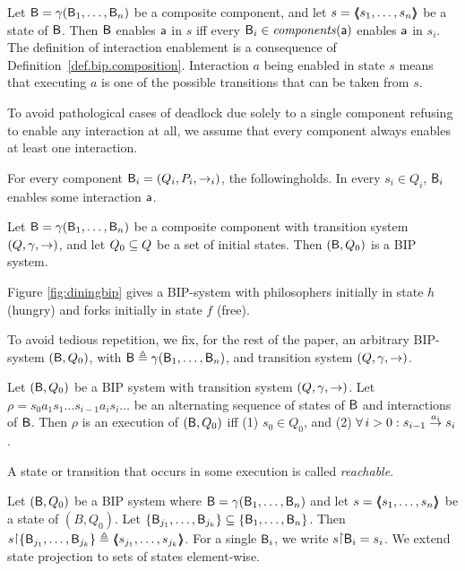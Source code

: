 Let $\B = \gamma(\B_1,\dots,\B_n)$ be a composite component, and let $s =
\tpl{s_1,\ldots,s_n}$ be a state of $\B$.  Then $\B$ enables $\act$ in $s$
iff every $\B_i \in \cmps{\act}$ enables $\act$ in $s_i$.  
\ed
%
The definition of  interaction enablement is a consequence of 
Definition~\ref{def.bip.composition}.
Interaction $a$ being enabled in state $s$ means that executing
$a$ is one of the possible transitions that can be taken from $s$.

To avoid pathological cases of deadlock due solely to a single component refusing to enable any interaction at all, 
we assume that every component always enables at least one interaction.

 \label{def.bip.local-enablement}
For every component  $\B_i = (Q_i,P_i,\goesto_i)$, the followingholds. In every $s_i \in Q_i$, $\B_i$ enables some
interaction $\act$.
\ed




\label{def.bip.system} Let $\B = \gamma(\B_1,\dots,\B_n)$ be a composite component with transition system $(Q,\gamma,
\goestog)$, and let $Q_0 \sub Q$ be a set of initial states. Then $(\B,Q_0)$ is a BIP system.  \ed

\noindent
Figure \ref{fig:diningbip} gives a BIP-system with philosophers initially in state $h$ (hungry) and forks initially in
state $f$ (free).

To avoid tedious repetition, we fix, for the rest of the paper, an arbitrary BIP-system $(\B, Q_0)$, with
$\B \df \gamma(\B_1,\dots,\B_n)$, and transition system $(Q,\gamma, \goestog)$.





\bd[Execution]\label{def.bip.execution} Let $(\B, Q_0)$ be a BIP system
with transition system $(Q,\gamma, \goestog)$.  
Let $\rho = s_0 a_1 s_1 \ldots s_{i-1} a_i s_i \ldots$ be an alternating sequence of
states of $\B$ and interactions of $\B$. Then $\rho$ is an execution of
$(\B, Q_0)$ iff (1) $s_0 \in Q_0$, and (2) $\fa i > 0: s_{i-1} \goesto[a_i] s_i$.  \ed



\label{def.bip.reachable}
A state or transition that occurs in some execution is called \emph{reachable}.

\ed


\label{def.bip.state.projection} Let $(\B, Q_0)$
be a BIP system where $\B = \gamma(\B_1,\dots,\B_n)$ and let $s =
\tpl{s_1,\dots,s_n}$ be a state of $(B, Q_0)$. Let 
$\set{\B_{j_1},\dots,\B_{j_k}} \sub \set{\B_1,\dots,\B_n}$. Then $s \pj
\set{\B_{j_1},\dots,\B_{j_k}} \df \tpl{s_{j_1},\dots,s_{j_k}}$. For a
single $\B_i$, we write $s \pj \B_i = s_i$.
%
We extend state projection to sets of states element-wise.
\ed


